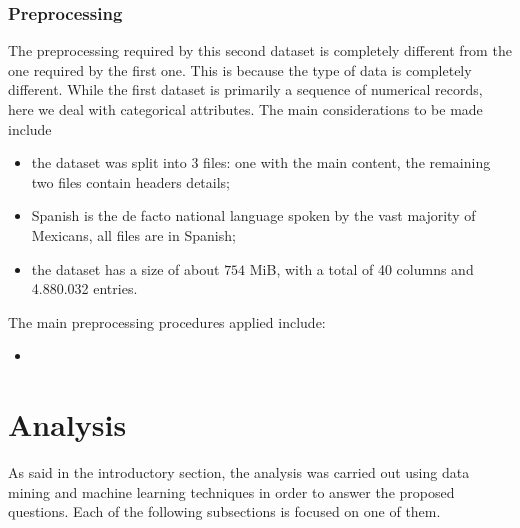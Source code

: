 \documentclass[11pt,a4paper]{article}
\begin{document}
\subsubsection{Preprocessing}
The preprocessing required by this second dataset is completely different from
the one required  by the first one. This is because the type of data is
completely different. While the first dataset is primarily a sequence of
numerical records, here we deal with categorical attributes. The main
considerations to be made include
\begin{itemize}
    \item the dataset was split into $3$ files: one with the main content, the
    remaining two files contain headers details;
    \item Spanish is the de facto national language spoken by the vast majority
    of Mexicans, all files are in Spanish;
    \item the dataset has a size of about $754$ MiB, with a total of 40 columns
    and 4.880.032 entries.
\end{itemize}
The main preprocessing procedures applied include:
\begin{itemize}
    \item 
\end{itemize}

\section{Analysis}
As said in the introductory section, the analysis was carried out using data
mining and machine learning techniques in order to answer the proposed
questions. Each of the following subsections is focused on one of them.
\end{document}
